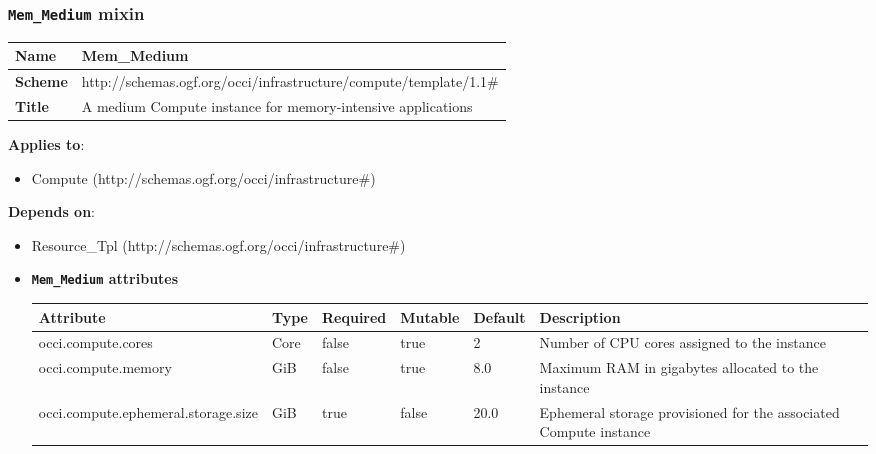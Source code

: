 \subsubsection{\texttt{Mem\_Medium} mixin}
\begin{center}
\begin{tabular}{|l|l|}
  \hline
  \textbf{Name} & Mem\_Medium \\
  \hline  
  \textbf{Scheme} & http://schemas.ogf.org/occi/infrastructure/compute/template/1.1\# \\
  \hline
  \textbf{Title} & A medium Compute instance for memory-intensive applications \\
  \hline
\end{tabular}
\end{center}
\textbf{Applies to}:
\begin{itemize}
	\item Compute (http://schemas.ogf.org/occi/infrastructure\#)
\end{itemize}
\textbf{Depends on}:
\begin{itemize}
	\item Resource\_Tpl (http://schemas.ogf.org/occi/infrastructure\#)
\end{itemize}

\begin{itemize}
\item \textbf{\texttt{Mem\_Medium} attributes}

\begin{tabularx}{\textwidth}{|l|l|p{1.4cm}|p{1.3cm}|l|X|}
  \hline
  \textbf{Attribute} & \textbf{Type} & \textbf{Required} & \textbf{Mutable} & \textbf{Default} & \textbf{Description} \\
  \hline  
  occi.compute.cores & Core & false & true & 2 & Number of CPU cores assigned to the instance \\
  \hline
  occi.compute.memory & GiB & false & true & 8.0 & Maximum RAM in gigabytes allocated to the instance \\
  \hline
  occi.compute.ephemeral.storage.size & GiB & true & false & 20.0 & Ephemeral storage provisioned for the associated Compute instance \\
  \hline
\end{tabularx}
\end{itemize}


